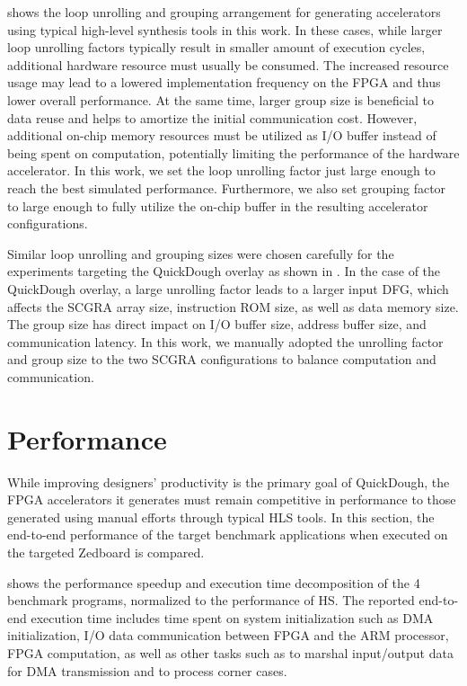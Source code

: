  shows the loop unrolling and grouping arrangement for generating accelerators using typical high-level synthesis tools in this work. In these cases, while larger loop unrolling factors typically result in smaller amount of execution cycles, additional hardware resource must usually be consumed. The increased resource usage may lead to a lowered implementation frequency on the FPGA and thus lower overall performance. At the same time, larger group size is beneficial to data reuse and helps to amortize the initial communication cost. However, additional on-chip memory resources must be utilized as I/O buffer instead of being spent on computation, potentially limiting the performance of the hardware accelerator. In this work, we set the loop unrolling factor just large enough to reach the best simulated performance. Furthermore, we also set grouping factor to large enough to fully utilize the on-chip buffer in the resulting accelerator configurations. 

Similar loop unrolling and grouping sizes were chosen carefully for the experiments targeting the
QuickDough overlay as shown in  . In the case of the
QuickDough overlay, a large unrolling factor leads to a larger input DFG, which affects the SCGRA
array size, instruction ROM size, as well as data memory size. The group size has direct impact on
I/O buffer size, address buffer size, and communication latency. In this work, we manually adopted
the unrolling factor and group size to the two SCGRA configurations to balance computation and
communication.


\section{Performance} \label{sec:performance}
While improving designers' productivity is the primary goal of QuickDough, the FPGA accelerators it
generates must remain competitive in performance to those generated using manual efforts through
typical HLS tools.  In this section, the end-to-end performance of the target benchmark applications
when executed on the targeted Zedboard \cite{zedboard} is compared.

 shows the performance speedup and execution time decomposition of the 4
benchmark programs, normalized to the performance of HS. The reported end-to-end execution
time includes time spent on system initialization such as DMA initialization, I/O data communication
between FPGA and the ARM processor, FPGA computation, as well as other tasks such as to marshal
input/output data for DMA transmission and to process corner cases.

